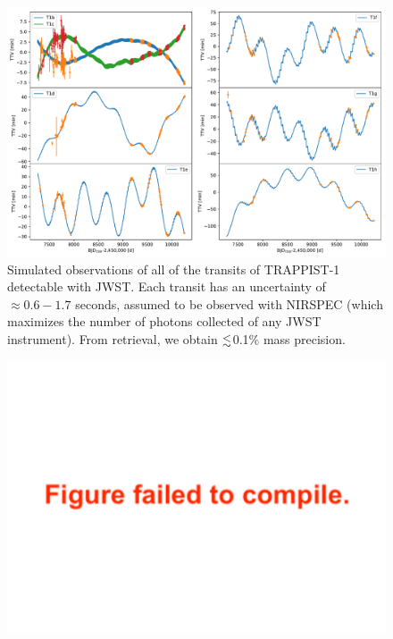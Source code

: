 \documentclass[twocolumn]{aastex63}
\begin{document}
\begin{figure}
    \centering
    \includegraphics[width=\hsize]{figures/T1_JWST_all_transits_tight.pdf}
    {Simulated observations of all of the transits of TRAPPIST-1
        detectable with JWST.  Each transit has an
        uncertainty of ${\approx} 0.6-1.7   $ seconds, assumed to be observed with
        NIRSPEC (which maximizes the number of photons collected of any JWST
        instrument).  From retrieval, we obtain
        ${\lesssim}$0.1\% mass precision.}
    \label{fig:JWST_all_the_transits}
\end{figure}

\begin{figure}
    \centering
    \includegraphics[width=\hsize]{figures/Recovered_masses_JWST_5yr_all_transits_NIRSPEC.pdf}
    \label{fig:JWST_all_mass}
\end{figure}
\end{document}
